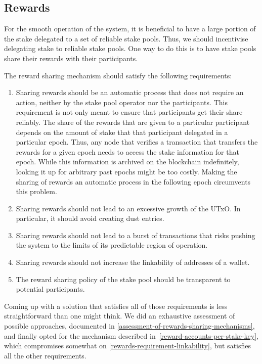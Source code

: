 \documentclass[11pt,a4paper,dvipsnames,twosided]{article}
\begin{document}
\subsection{Rewards}
\label{rewards}

For the smooth operation of the system, it is beneficial to have a large
portion of the stake delegated to a set of reliable stake pools. Thus,
we should incentivise delegating stake to reliable stake pools. One way
to do this is to have stake pools share their rewards with their
participants.

The reward sharing mechanism should satisfy the following requirements:

\begin{enumerate}
\item
  Sharing rewards should be an automatic process that does not require
  an action, neither by the stake pool operator nor the participants.
  This requirement is not only meant to ensure that participants get
  their share reliably. The share of the rewards that are given to a
  particular participant depends on the amount of stake that that
  participant delegated in a particular epoch. Thus, any node that
  verifies a transaction that transfers the rewards for a given epoch
  needs to access the stake information for that epoch. While this
  information is archived on the blockchain indefinitely, looking it up
  for arbitrary past epochs might be too costly. Making the sharing of
  rewards an automatic process in the following epoch circumvents this
  problem.
\item
  Sharing rewards should not lead to an excessive growth of the UTxO. In
  particular, it should avoid creating dust entries.
\item
  Sharing rewards should not lead to a burst of transactions that risks
  pushing the system to the limits of its predictable region of
  operation.
\item\label{rewards-requirement-linkability}
  Sharing rewards should not increase the linkability of addresses of a
  wallet.
\item
  The reward sharing policy of the stake pool should be transparent to
  potential participants.
\end{enumerate}

Coming up with a solution that satisfies all of those requirements is
less straightforward than one might think. We did an exhaustive
assessment of possible approaches, documented in
\cref{assessment-of-rewards-sharing-mechanisms}, and finally opted for
the mechanism described in~\ref{reward-accounts-per-stake-key}, which
compromises somewhat on \cref{rewards-requirement-linkability}, but
satisfies all the other requirements.
\end{document}
